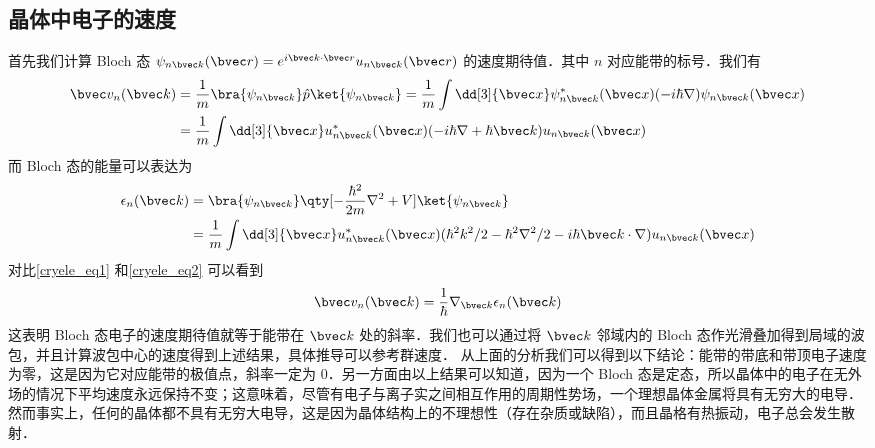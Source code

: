 \subsection{晶体中电子的速度}
首先我们计算 Bloch 态 $\psi_{n\bvec k}(\bvec r)=e^{i\bvec k\cdot \bvec r}u_{n\bvec k}(\bvec r)$ 的速度期待值．其中 $n$ 对应能带的标号．我们有
\begin{equation}\label{cryele_eq1}
\begin{aligned}
\bvec v_n(\bvec k)&=\frac{1}{m}\bra{\psi_{n\bvec k}}\hat p\ket{\psi_{n\bvec k}}=\frac{1}{m}\int \dd[3]{\bvec x}\psi_{n\bvec k}^*(\bvec x)(-i\hbar\nabla)\psi_{n\bvec k}(\bvec x)\\
&=\frac{1}{m}\int \dd[3]{\bvec x}u_{n\bvec k}^*(\bvec x)(-i\hbar\nabla+\hbar \bvec k)u_{n\bvec k}(\bvec x)
\end{aligned}
\end{equation}
而 Bloch 态的能量可以表达为
\begin{equation}\label{cryele_eq2}
\begin{aligned}
\epsilon_{n}(\bvec k)&=\bra{\psi_{n\bvec k}} \qty[-\frac{\hbar^2}{2m}\nabla^2+V]\ket{\psi_{n\bvec k}}
\\&=\frac{1}{m}\int \dd[3]{\bvec x} u_{n\bvec k}^*(\bvec x)(\hbar^2k^2/2-\hbar^2\nabla^2/2-i\hbar\bvec k\cdot \nabla)u_{n\bvec k}(\bvec x)
\end{aligned}
\end{equation}
对比\autoref{cryele_eq1} 和\autoref{cryele_eq2} 可以看到
\begin{equation}\label{cryele_eq3}
\bvec v_n(\bvec k)=\frac{1}{\hbar}\nabla_{\bvec k}\epsilon_{n}(\bvec k)
\end{equation}
这表明 Bloch 态电子的速度期待值就等于能带在 $\bvec k$ 处的斜率．我们也可以通过将 $\bvec k$ 邻域内的 Bloch 态作光滑叠加得到局域的波包，并且计算波包中心的速度得到上述结果，具体推导可以参考群速度． 从上面的分析我们可以得到以下结论：能带的带底和带顶电子速度为零，这是因为它对应能带的极值点，斜率一定为 $0$．另一方面由以上结果可以知道，因为一个 Bloch 态是定态，所以晶体中的电子在无外场的情况下平均速度永远保持不变；这意味着，尽管有电子与离子实之间相互作用的周期性势场，一个理想晶体金属将具有无穷大的电导．然而事实上，任何的晶体都不具有无穷大电导，这是因为晶体结构上的不理想性（存在杂质或缺陷），而且晶格有热振动，电子总会发生散射．
